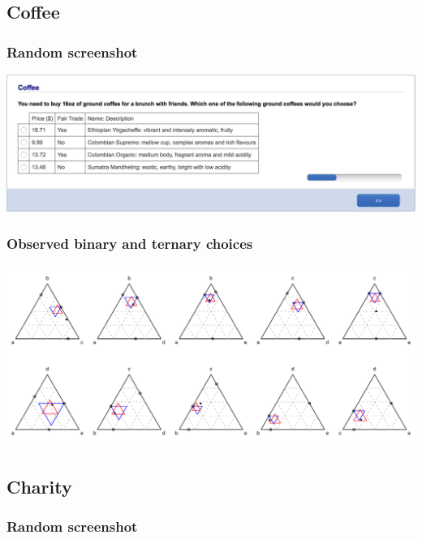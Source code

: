 \documentclass[11pt,letter]{article}
\begin{document}
\pagebreak

\subsection*{Coffee}



\subsubsection*{Random screenshot}

\includegraphics[width=15cm]{Population_study_design/screenshot_coffee.png}

\subsubsection*{Observed binary and ternary choices}

\includegraphics[width=15cm]{./Population_study_data/Simplexes/coffee.pdf}

\pagebreak

\subsection*{Charity}



\subsubsection*{Random screenshot}
\end{document}
